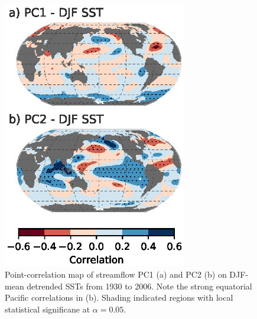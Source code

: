 \documentclass[final, double]{ua-thesis}
\begin{document}
\begin{figure}[ht]
 \centerline{\includegraphics[width=19pc]{p2figures/fig_streamflow_pc_sst.eps}}
  \caption{Point-correlation map of streamflow PC1 (a) and PC2 (b) on DJF-mean detrended SSTs from 1930 to 2006. Note the strong equatorial Pacific correlations in (b). Shading indicated regions with local statistical significane at $\alpha = 0.05$.}\label{fig_streamflow_pc_sst}
\end{figure}
\end{document}
